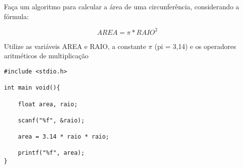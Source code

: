 
Faça um algoritmo para calcular a área de uma circunferência, considerando a fórmula:

\begin{equation}
AREA = \pi * RAIO^2
\end{equation}

Utilize as variáveis AREA e RAIO, a constante $\pi$ (pi = 3,14) e os operadores aritméticos de multiplicação

\begin{solution}
\begin{lstlisting}
#include <stdio.h>

int main void(){

	float area, raio;
	
	scanf("%f", &raio);
	
	area = 3.14 * raio * raio;
	
	printf("%f", area);
}
\end{lstlisting}
\end{solution}

